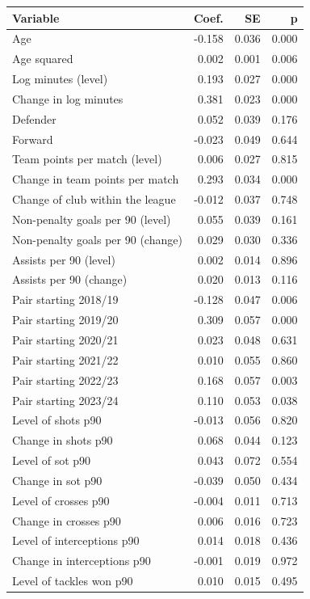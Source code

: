 \begin{tabular}{lrrr}
\toprule
Variable & Coef. & SE & p \\
\midrule
Age & -0.158 & 0.036 & 0.000 \\
Age squared & 0.002 & 0.001 & 0.006 \\
Log minutes (level) & 0.193 & 0.027 & 0.000 \\
Change in log minutes & 0.381 & 0.023 & 0.000 \\
Defender & 0.052 & 0.039 & 0.176 \\
Forward & -0.023 & 0.049 & 0.644 \\
Team points per match (level) & 0.006 & 0.027 & 0.815 \\
Change in team points per match & 0.293 & 0.034 & 0.000 \\
Change of club within the league & -0.012 & 0.037 & 0.748 \\
Non-penalty goals per 90 (level) & 0.055 & 0.039 & 0.161 \\
Non-penalty goals per 90 (change) & 0.029 & 0.030 & 0.336 \\
Assists per 90 (level) & 0.002 & 0.014 & 0.896 \\
Assists per 90 (change) & 0.020 & 0.013 & 0.116 \\
Pair starting 2018/19 & -0.128 & 0.047 & 0.006 \\
Pair starting 2019/20 & 0.309 & 0.057 & 0.000 \\
Pair starting 2020/21 & 0.023 & 0.048 & 0.631 \\
Pair starting 2021/22 & 0.010 & 0.055 & 0.860 \\
Pair starting 2022/23 & 0.168 & 0.057 & 0.003 \\
Pair starting 2023/24 & 0.110 & 0.053 & 0.038 \\
Level of shots p90 & -0.013 & 0.056 & 0.820 \\
Change in shots p90 & 0.068 & 0.044 & 0.123 \\
Level of sot p90 & 0.043 & 0.072 & 0.554 \\
Change in sot p90 & -0.039 & 0.050 & 0.434 \\
Level of crosses p90 & -0.004 & 0.011 & 0.713 \\
Change in crosses p90 & 0.006 & 0.016 & 0.723 \\
Level of interceptions p90 & 0.014 & 0.018 & 0.436 \\
Change in interceptions p90 & -0.001 & 0.019 & 0.972 \\
Level of tackles won p90 & 0.010 & 0.015 & 0.495 \\

\end{tabular}
